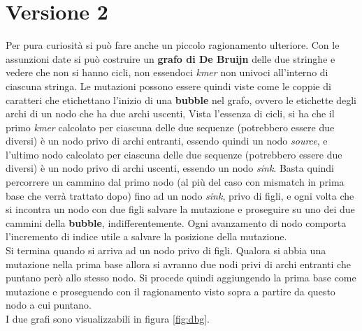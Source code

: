 \documentclass[a4paper,12pt, oneside]{book}
\begin{document}
\section{Versione 2}
Per pura curiosità si può fare anche un piccolo ragionamento ulteriore. Con le
assunzioni date si può costruire un \textbf{grafo di De Bruijn} delle due
stringhe e vedere che non si hanno cicli, non essendoci \textit{kmer} non
univoci all'interno di ciascuna stringa. Le mutazioni possono essere quindi
viste come le coppie di caratteri 
che etichettano l'inizio di una \textbf{bubble} nel grafo, ovvero le etichette
degli archi di un nodo che ha due archi uscenti, Vista l'essenza di
cicli, si ha che il primo \textit{kmer} calcolato per ciascuna delle due
sequenze (potrebbero essere due diversi) è un nodo privo di archi entranti,
essendo quindi un nodo \textit{source}, e
l'ultimo nodo calcolato per ciascuna delle due
sequenze (potrebbero essere due diversi) è un nodo privo di archi uscenti,
essendo un nodo \textit{sink}. Basta quindi percorrere un cammino dal primo nodo
(al più del caso con mismatch in prima base che verrà trattato dopo) fino ad un
nodo \textit{sink}, privo di figli, e ogni volta che si incontra un nodo con due
figli salvare la mutazione e proseguire su uno dei due cammini della
\textbf{bubble}, indifferentemente. Ogni avanzamento di nodo comporta
l'incremento di indice utile a salvare la posizione della mutazione.\\
Si termina quando si arriva ad un nodo privo di figli.
Qualora si abbia una mutazione nella prima base allora si avranno due
nodi privi di archi entranti che puntano però allo stesso nodo. Si procede
quindi aggiungendo la prima base come mutazione e proseguendo con il
ragionamento visto sopra a partire da questo nodo a cui puntano.\\
I due grafi sono visualizzabili in figura \ref{fig:dbg}.
\end{document}
